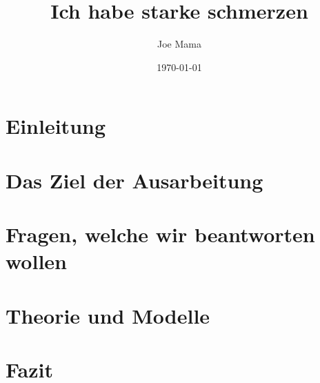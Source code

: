 \documentclass[12pt]{article}
\title{Ich habe starke schmerzen }
\author{Joe Mama}
\date{\today}
\begin{document}
    
    \newpage

    \tableofcontents
    \newpage

    \section{Einleitung}
        
    
    \section{Das Ziel der Ausarbeitung} 
        
    
    \section{Fragen, welche wir beantworten wollen}
        
    
    \section{Theorie und Modelle}
        
    
    \section{Fazit}
        
    
    \newpage
    \printbibliography
\end{document}
